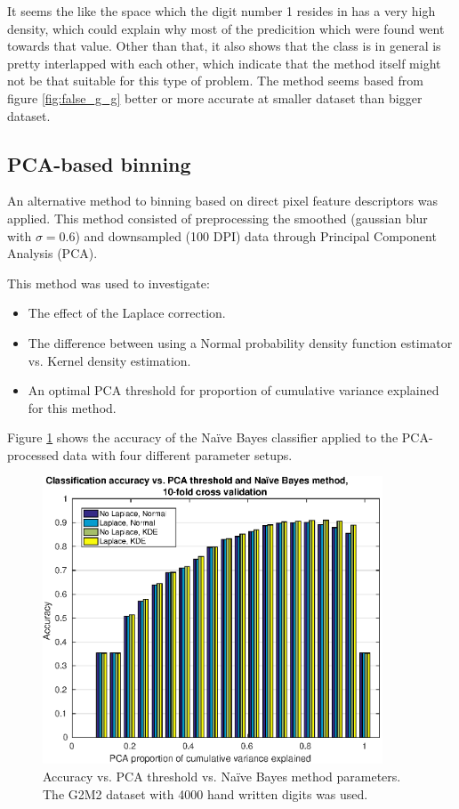 \documentclass[10pt,a4paper]{article}
\begin{document}
It seems the like the space which the digit number 1 resides in has a very high density, which could explain why most of the predicition which were found went towards that value. 
Other than that, it also shows that the class is in general is pretty interlapped with each other, which indicate that the method itself might not be that suitable for this type of problem.  The method seems based from figure \ref{fig:false_g_g} better or more accurate at smaller dataset than bigger dataset. 

\subsection{PCA-based binning}
An alternative method to binning based on direct pixel feature descriptors was applied.
This method consisted of preprocessing the smoothed (gaussian blur with \(\sigma=0.6\))
and downsampled (100 DPI) data through Principal Component Analysis (PCA).

This method was used to investigate:
\begin{itemize}
\item The effect of the Laplace correction.
\item The difference between using a Normal probability density function estimator vs. Kernel density estimation.
\item An optimal PCA threshold for proportion of cumulative variance explained for this method.
\end{itemize}

Figure \ref{fig:nbPDresults} shows the accuracy
of the Naïve Bayes classifier applied to the PCA-processed data
with four different parameter setups.

\begin{figure}[ht]
\centering
\includegraphics[width=0.9\textwidth]{nbPD-accuracy-vs-pca-vs-nb.eps}
\caption{Accuracy vs. PCA threshold vs. Naïve Bayes method parameters.
The G2M2 dataset with 4000 hand written digits was used.}
\label{fig:nbPDresults}
\end{figure}
\end{document}
